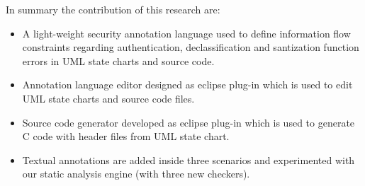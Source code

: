 In summary the contribution of this research are:
\begin{itemize}
 \item A light-weight security annotation language
	used to define information flow constraints regarding authentication, declassification and santization function errors in UML state charts and source code.
	
\item Annotation language editor designed as eclipse
	plug-in which is used to edit UML state charts and
	source code files.
	
\item Source code generator developed as eclipse plug-in which is used to generate C code with header files from UML state chart.
	
\item Textual annotations are added inside three scenarios and experimented with our static analysis engine (with three new checkers).

\end{itemize}

 


